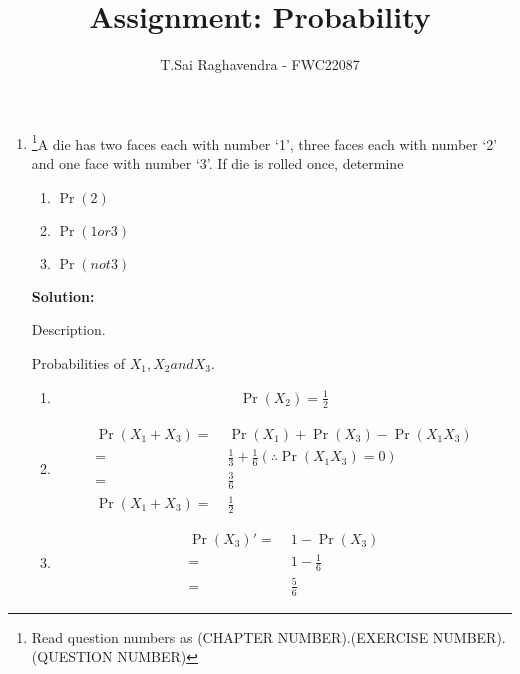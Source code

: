 \documentclass{article}
\providecommand{\pr}[1]{\ensuremath{\Pr\left(#1\right)}}
\newcommand{\solution}{\noindent \textbf{Solution: }}
\begin{document}
\title{Assignment: Probability}
\author{\Large T.Sai Raghavendra - FWC22087}
\date{}


\maketitle
\begin{enumerate}[label=16.\arabic{enumi}.\arabic{enumii}]%
\setcounter{enumi}{3}
\setcounter{enumii}{3}

\item \footnote{Read question numbers as (CHAPTER NUMBER).(EXERCISE NUMBER).(QUESTION NUMBER)}A die has two faces each with number ‘1’, three faces each with number ‘2’ and one face with number ‘3’. If die is rolled once, determine
\begin{enumerate}
\item \pr{2}
\item \pr{1 or 3}
\item \pr{not 3}
\end{enumerate}

\solution
	\begin{table}[h]
	
	\caption{Description.}
	\label{tables:table1}
	\end{table}

	\begin{table}[h]
	\caption{Probabilities of $X_1,X_2 and X_3$.}
	\label{tables:table2}
	\end{table}

\begin{enumerate}
\item \begin{align}
\pr{X_2} = \frac{1}{2}  %
\end{align}	
\item 
\begin{align}
\pr{X_1 + X_3}	=& \; \pr{X_1} + \pr{X_3} - \pr{X_1X_3}\\
				=& \; \frac{1}{3} + \frac{1}{6}   (\therefore \pr{X_1X_3} = 0)\\
				=& \; \frac{3}{6}\\
\pr{X_1 + X_3} 	=& \; \frac{1}{2}
\end{align}
\item 
\begin{align}
\pr{X_3}\prime =& \;1 - \pr{X_3}\\
			   =& \;1 - \frac{1}{6}\\
			   =& \;\frac{5}{6}
\end{align}
\end{enumerate}
\end{enumerate}
\end{document}
